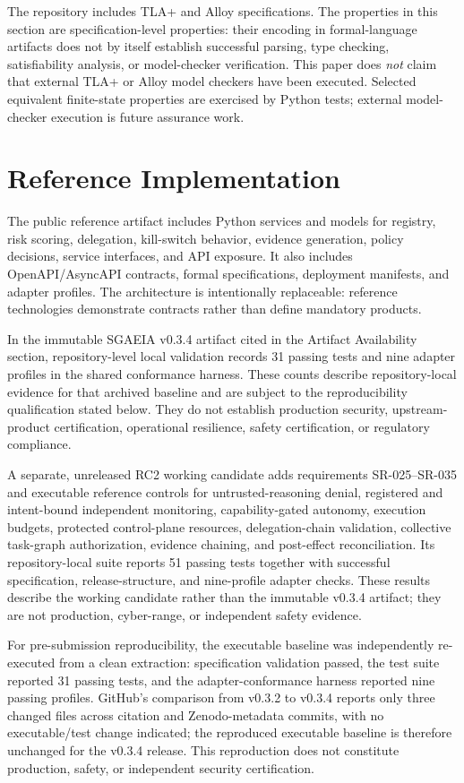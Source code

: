 \documentclass[11pt]{article}
\begin{document}
The repository includes TLA+ and Alloy specifications. The properties in this section are specification-level properties: their encoding in formal-language artifacts does not by itself establish successful parsing, type checking, satisfiability analysis, or model-checker verification. This paper does \emph{not} claim that external TLA+ or Alloy model checkers have been executed. Selected equivalent finite-state properties are exercised by Python tests; external model-checker execution is future assurance work.

\section{Reference Implementation}
The public reference artifact includes Python services and models for registry, risk scoring, delegation, kill-switch behavior, evidence generation, policy decisions, service interfaces, and API exposure. It also includes OpenAPI/AsyncAPI contracts, formal specifications, deployment manifests, and adapter profiles. The architecture is intentionally replaceable: reference technologies demonstrate contracts rather than define mandatory products.

In the immutable SGAEIA v0.3.4 artifact cited in the Artifact Availability section, repository-level local validation records 31 passing tests and nine adapter profiles in the shared conformance harness. These counts describe repository-local evidence for that archived baseline and are subject to the reproducibility qualification stated below. They do not establish production security, upstream-product certification, operational resilience, safety certification, or regulatory compliance.

A separate, unreleased RC2 working candidate adds requirements SR-025--SR-035 and executable reference controls for untrusted-reasoning denial, registered and intent-bound independent monitoring, capability-gated autonomy, execution budgets, protected control-plane resources, delegation-chain validation, collective task-graph authorization, evidence chaining, and post-effect reconciliation. Its repository-local suite reports 51 passing tests together with successful specification, release-structure, and nine-profile adapter checks. These results describe the working candidate rather than the immutable v0.3.4 artifact; they are not production, cyber-range, or independent safety evidence.

For pre-submission reproducibility, the executable baseline was independently re-executed from a clean extraction: specification validation passed, the test suite reported 31 passing tests, and the adapter-conformance harness reported nine passing profiles. GitHub's comparison from v0.3.2 to v0.3.4 reports only three changed files across citation and Zenodo-metadata commits, with no executable/test change indicated; the reproduced executable baseline is therefore unchanged for the v0.3.4 release. This reproduction does not constitute production, safety, or independent security certification.
\end{document}
